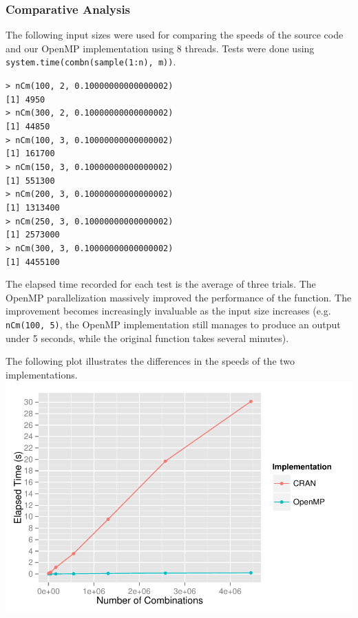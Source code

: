 \subsubsection{Comparative Analysis}
The following input sizes were used for comparing the speeds of the source code and our OpenMP implementation using 8 threads. Tests were done using \texttt{system.time(combn(sample(1:n), m))}.\\
\null

\texttt{> nCm(100, 2, 0.10000000000000002)}\\
\texttt{[1] 4950}\\
\texttt{> nCm(300, 2, 0.10000000000000002)}\\
\texttt{[1] 44850}\\
\texttt{> nCm(100, 3, 0.10000000000000002)}\\
\texttt{[1] 161700}\\
\texttt{> nCm(150, 3, 0.10000000000000002)}\\
\texttt{[1] 551300}\\
\texttt{> nCm(200, 3, 0.10000000000000002)}\\
\texttt{[1] 1313400}\\
\texttt{> nCm(250, 3, 0.10000000000000002)}\\
\texttt{[1] 2573000}\\
\texttt{> nCm(300, 3, 0.10000000000000002)}\\
\texttt{[1] 4455100}\\
\null

The elapsed time recorded for each test is the average of three trials. The OpenMP parallelization massively improved the performance of the function. The improvement becomes increasingly invaluable as the input size increases (e.g. \texttt{nCm(100, 5)}, the OpenMP implementation still manages to produce an output under 5 seconds, while the original function takes several minutes).\\
\null

The following plot illustrates the differences in the speeds of the two implementations.\\
\includegraphics{openmp.pdf}

